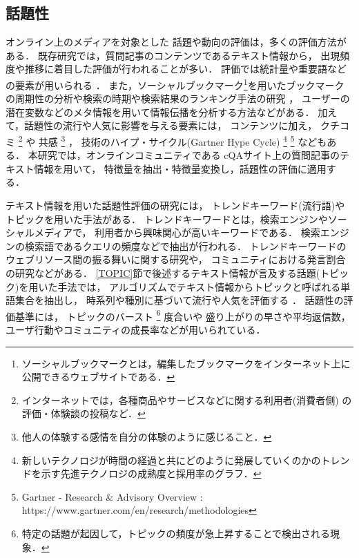 \documentclass[12pt,a4paper,twocolumn,twoside]{jsik}
\begin{document}
\subsection{話題性}\label{TOPIC_TREND}
オンライン上のメディアを対象とした
話題や動向の評価は，多くの評価方法がある．
既存研究では，質問記事のコンテンツであるテキスト情報から，
出現頻度や推移に着目した評価が行われることが多い．
評価では統計量や重要語などの要素が用いられる
\cite{trend,weblogs}．
%
また，ソーシャルブックマーク\footnote{
ソーシャルブックマークとは，編集したブックマークをインターネット上に公開できるウェブサイトである．
}を用いたブックマークの周期性の分析や検索の時期や検索結果のランキング手法の研究
\cite{discovering_periodicity_socialbookmark,reranking_method_socialbookmark}，
ユーザーの潜在変数などのメタ情報を用いて情報伝播を分析する方法などがある\cite{information_diffusion_model}．
%
加えて，話題性の流行や人気に影響を与える要素には，
コンテンツに加え，
クチコミ
\cite{buzz_mrk}
\footnote{インターネットでは，各種商品やサービスなどに関する利用者(消費者側) の評価・体験談の投稿など．}
や
共感
\cite{SIPS}
\footnote{他人の体験する感情を自分の体験のように感じること．}
，
技術のハイプ・サイクル(Gartner Hype Cycle)
\cite{gartner}
\footnote{新しいテクノロジが時間の経過と共にどのように発展していくのかのトレンドを示す先進テクノロジの成熟度と採用率のグラフ．}
\footnote{Gartner - Research \& Advisory Overview : 
\\https://www.gartner.com/en/research/methodologies}
などもある．
%
本研究では，オンラインコミュニティである
cQAサイト上の質問記事のテキスト情報を用いて，
特徴量を抽出・特徴量変換し，話題性の評価に適用する．

テキスト情報を用いた話題性評価の研究には，
トレンドキーワード(流行語)やトピックを用いた手法がある．
%
トレンドキーワードとは，検索エンジンやソーシャルメディアで，
利用者から興味関心が高いキーワードである．
検索エンジンの検索語であるクエリの頻度などで抽出が行われる．
%
トレンドキーワードのウェブリソース間の振る舞いに関する研究や，
コミュニティにおける発言割合の研究などがある\cite{trend_query_analysis,gradual_buzzwords}．
%
\ref{TOPIC}節で後述するテキスト情報が言及する話題(トピック)を用いた手法では，
アルゴリズムでテキスト情報からトピックと呼ばれる単語集合を抽出し，
時系列や種別に基づいて流行や人気を評価する
\cite{topic_book,topic_burst}．
%
話題性の評価基準には，
トピックのバースト
\footnote{
特定の話題が起因して，トピックの頻度が急上昇することで検出される現象．}
度合い\cite{topic_burst}や
盛り上がりの早さや平均返信数\cite{article_matsumura}，
ユーザ行動やコミュニティの成長率\cite{article_toriumi}などが用いられている．
\end{document}

